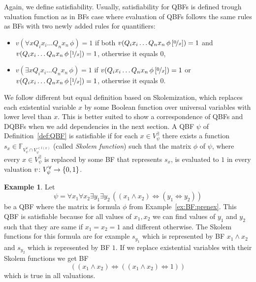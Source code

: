\documentclass[
  digital, %
  twoside, %
  table,   %
  nolof,     %
  nolot,     %
]{fithesis3}
\let\setbuilder\set
\newcommand{\simpleset}[1]{\{{#1}\}}
\renewcommand{\set}[1]{\normalexpandarg\IfSubStr{#1}{|}{\setbuilder{#1}}{\simpleset{#1}}}
\theoremstyle{definition}
\newtheorem{example}{Example}
\theoremstyle{remark}
\newcommand{\substitute}[2]{\left[ \nicefrac{#2}{#1} \right]}
\newcommand{\BFuncs}[1]{\mathbb{F}_{#1}}
\newcommand{\evars}[1]{V_{#1}^{\exists}}
\newcommand{\uvars}[1]{V_{#1}^{\forall}}
\newcommand{\lequal}{\Leftrightarrow}
\newcommand{\itholds}{\,}
\begin{document}
Again, we define satisfiability. Usually, satisfiability for QBFs is defined trough valuation function as in BFs case where evaluation of QBFs follows the same rules as BFs with two newly added rules for quantifiers:
\begin{itemize}
    \item $v(\forall x Q_i x_i \dots Q_n x_n \itholds \phi) = 1$ if both $v(Q_i x_i \dots Q_n x_n \itholds \phi\substitute{x}{0}) = 1$ and $v(Q_i x_i \dots Q_n x_n \itholds \phi\substitute{x}{1}) = 1$, otherwise it equals $0$,
    \item $v(\exists x Q_i x_i \dots Q_n x_n \itholds \phi) = 1$ if $v(Q_i x_i \dots Q_n x_n \itholds \phi\substitute{x}{0}) = 1$ or \\ $v(Q_i x_i \dots Q_n x_n \itholds \phi\substitute{x}{1}) = 1$, otherwise it equals $0$.
\end{itemize}
We follow different but equal definition based on Skolemization, which replaces each existential variable $x$ by some Boolean function over universal variables with lower level than $x$. This is better suited to show a correspondence of QBFs and DQBFs when we add dependencies in the next section. A QBF $\psi$ of Definition~\ref{def:QBF} is satisfiable if for each $x \in V_{\psi}^{\exists}$ there exists a function $s_{x} \in \BFuncs{\uvars{\psi}\cap V_{\psi}^{<l(x)}}$ (called \emph{Skolem function}) such that the matrix $\phi$ of $\psi$, where every $x \in \evars{\psi}$ is replaced by some BF that represents $s_x$, is evaluated to $1$ in every valuation $v\colon \uvars{\psi} \to \set{0,1}$.

\begin{example}
\label{ex:QBF:prenex}
Let 
\[\psi = \forall x_1 \forall x_2 \exists y_1  \exists y_2 \itholds ((x_1 \land x_2) \lequal (y_1 \lequal y_2))\]
be a QBF where the matrix is formula $\phi$ from Example~\ref{ex:BF:prenex}. This QBF is satisfiable because for all values of $x_1, x_2$ we can find values of $y_1$ and $y_2$ such that they are same if $x_1 = x_2 = 1$ and different otherwise. The Skolem functions for this formula are for example $s_{y_1}$ which is represented by BF $x_1 \land x_2$ and $s_{y_2}$ which is represented by BF $1$. If we replace existential variables with their Skolem functions we get BF
\[((x_1 \land x_2) \lequal ((x_1 \land x_2) \lequal 1))\]
which is true in all valuations.
\end{example}
\end{document}

